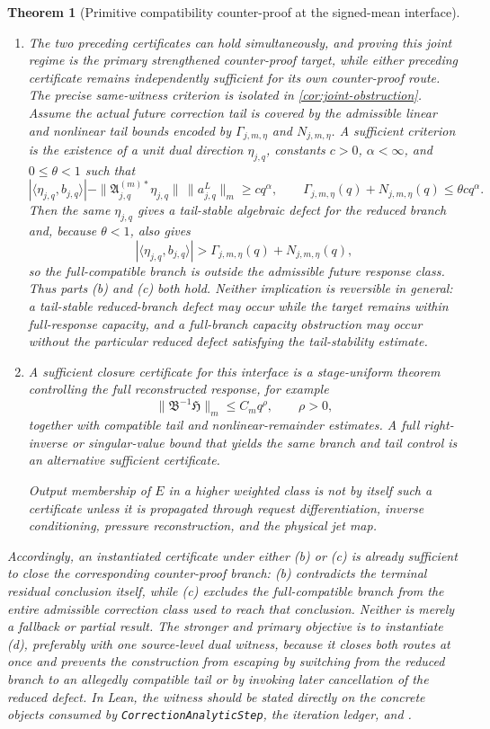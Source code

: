 \documentclass[12pt]{article}
\theoremstyle{plain}
\newtheorem{theorem}{Theorem}[section]
\theoremstyle{definition}
\theoremstyle{remark}
\newcommand{\Comp}{\mathfrak A}
\newcommand{\Red}{\mathfrak B}
\newcommand{\Hidden}{\mathfrak H}
\begin{document}
\begin{theorem}[Primitive compatibility counter-proof at the signed-mean interface]
\begin{enumerate}[label=(\alph*),leftmargin=2.2em,itemsep=0.35em]
\item The two preceding certificates can hold simultaneously, and proving this joint regime is the primary strengthened counter-proof target, while either preceding certificate remains independently sufficient for its own counter-proof route. The precise same-witness criterion is isolated in \cref{cor:joint-obstruction}. Assume the actual future correction tail is covered by the admissible linear and nonlinear tail bounds encoded by \(\Gamma_{j,m,\eta}\) and \(N_{j,m,\eta}\). A sufficient criterion is the existence of a unit dual direction \(\eta_{j,q}\), constants \(c>0\), \(\alpha<\infty\), and \(0\le\theta<1\) such that
\[
|\langle\eta_{j,q},b_{j,q}\rangle|
-\|\Comp_{j,q}^{(m)*}\eta_{j,q}\|\,\|a^L_{j,q}\|_m
\ge c q^\alpha,
\qquad
\Gamma_{j,m,\eta}(q)+N_{j,m,\eta}(q)
\le\theta c q^\alpha.
\]
Then the same \(\eta_{j,q}\) gives a tail-stable algebraic defect for the reduced branch and, because \(\theta<1\), also gives
\[
|\langle\eta_{j,q},b_{j,q}\rangle|
>\Gamma_{j,m,\eta}(q)+N_{j,m,\eta}(q),
\]
so the full-compatible branch is outside the admissible future response class. Thus parts (b) and (c) both hold. Neither implication is reversible in general: a tail-stable reduced-branch defect may occur while the target remains within full-response capacity, and a full-branch capacity obstruction may occur without the particular reduced defect satisfying the tail-stability estimate.

\item A sufficient closure certificate for this interface is a stage-uniform theorem controlling the \emph{full} reconstructed response, for example
\[
\|\Red^{-1}\Hidden\|_m\le C_mq^\rho,\qquad \rho>0,
\]
together with compatible tail and nonlinear-remainder estimates. A full right-inverse or singular-value bound that yields the same branch and tail control is an alternative sufficient certificate.

Output membership of \(E\) in a higher weighted class is not by itself such a certificate unless it is propagated through request differentiation, inverse conditioning, pressure reconstruction, and the physical jet map.
\end{enumerate}

Accordingly, an instantiated certificate under either (b) or (c) is already sufficient to close the corresponding counter-proof branch: (b) contradicts the terminal residual conclusion itself, while (c) excludes the full-compatible branch from the entire admissible correction class used to reach that conclusion. Neither is merely a fallback or partial result. The stronger and primary objective is to instantiate (d), preferably with one source-level dual witness, because it closes both routes at once and prevents the construction from escaping by switching from the reduced branch to an allegedly compatible tail or by invoking later cancellation of the reduced defect. In Lean, the witness should be stated directly on the concrete objects consumed by \texttt{CorrectionAnalyticStep}, the iteration ledger, and .
\end{theorem}
\end{document}
